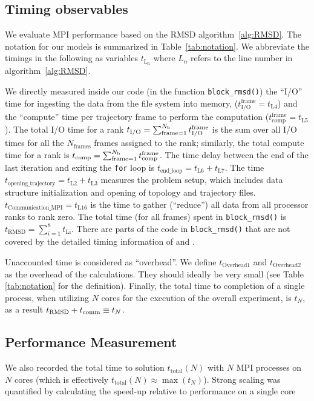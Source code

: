 \label{methods}

\subsection{Timing observables}
We evaluate MPI performance based on the RMSD algorithm~\ref{alg:RMSD}. 
The notation for our models is summarized in Table~\ref{tab:notation}.
We abbreviate the timings in the following as variables $t_{\text{L}_{\text{n}}}$ where $L_{n}$ refers to the line number in algorithm~\ref{alg:RMSD}.

We directly measured inside our code (in the function \texttt{block\_rmsd()}) the ``I/O'' time for
ingesting the data from the file system into memory, ($t_{\text{I/O}}^{\text{frame}} = t_{\text{L4}}$) and the ``compute'' time per
trajectory frame to perform the computation ($t_{\text{comp}}^{\text{frame}} = t_{\text{L5}}$).
The total I/O time for a rank  ${t}_{\text{I/O}} = \sum_{\text{frame}=1}^{N_{\text{b}}} t_{\text{I/O}}^{\text{frame}}$ is the sum over all I/O times for all the $N_{\text{frames}}$ frames assigned to the rank; similarly, the total compute time for a rank is ${t}_{\text{comp}} = \sum_{\text{frame}=1}^{N_{\text{b}}} t_{\text{comp}}^{\text{frame}}$. 
The time delay between the end of the last iteration and exiting the \texttt{for} loop is $t_{\text{end\_loop}} = t_{\text{L6}}+t_{\text{L7}}$.
The time $t_{\text{opening\_trajectory}} = t_{\text{L2}}+t_{\text{L3}}$ measures the problem setup, which includes data structure initialization and opening of topology and trajectory files.
$t_{\text{Communication\_{MPI}}} = t_{\text{L16}}$ is the time to gather (``reduce'') all data from all processor ranks to rank zero.
The total time (for all frames) spent in \texttt{block\_rmsd()} is $t_{\text{RMSD}} = \sum_{i=1}^{8}t_{\text{Li}}$. 
There are parts of the code in \texttt{block\_rmsd()} that are not covered by the detailed timing information of \tcomp and \tIO.

Unaccounted time is considered as ``overhead''. We define
$t_{\text{Overhead1}}$ and $t_{\text{Overhead2}}$ as the overhead of the calculations. 
They should ideally be very small (see Table \ref{tab:notation} for the definition). 
Finally, the total time to completion of a single process, when utilizing $N$ cores for the execution of the overall experiment, is $t_{N}$, as a result $t_{\text{RMSD}} + t_{\text{comm}} \equiv t_{N}$.

\subsection{Performance Measurement}
We also recorded the total time to solution $t_{\text{total}}(N)$ with $N$ MPI processes on $N$ cores (which is effectively
$t_{\text{total}}(N) \approx \max(t_{N})$). 
Strong scaling was quantified by calculating the speed-up relative to performance on a single core

